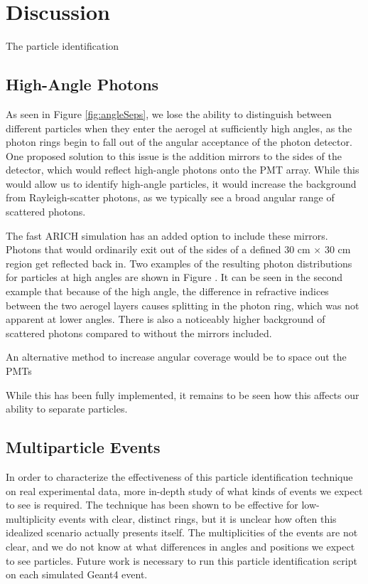 
\chapter{Discussion}
\label{ch:Discussion}

The particle identification 


\section{High-Angle Photons}
As seen in Figure \ref{fig:angleSeps}, we lose the ability to distinguish between different particles when they enter the aerogel at sufficiently high angles, as the photon rings begin to fall out of the angular acceptance of the photon detector.
One proposed solution to this issue is the addition mirrors to the sides of the detector, which would reflect high-angle photons onto the PMT array. 
While this would allow us to identify high-angle particles, it would increase the background from Rayleigh-scatter photons, as we typically see a broad angular range of scattered photons.

The fast ARICH simulation has an added option to include these mirrors.
Photons that would ordinarily exit out of the sides of a defined 30 cm $\times$ 30 cm region get reflected back in.
Two examples of the resulting photon distributions for particles at high angles are shown in Figure .
It can be seen in the second example that because of the high angle, the difference in refractive indices between the two aerogel layers causes splitting in the photon ring, which was not apparent at lower angles.
There is also a noticeably higher background of scattered photons compared to without the mirrors included.

An alternative method to increase angular coverage would be to space out the PMTs

While this has been fully implemented, it remains to be seen how this affects our ability to separate particles. 


\section{Multiparticle Events}
In order to characterize the effectiveness of this particle identification technique on real experimental data,  more in-depth study of what kinds of events we expect to see is required. 
The technique has been shown to be effective for low-multiplicity events with clear, distinct rings, but it is unclear how often this idealized scenario actually presents itself.
The multiplicities of the events are not clear, and we do not know at what differences in angles and positions we expect to see particles.
Future work is necessary to run this particle identification script on each simulated Geant4 event.

